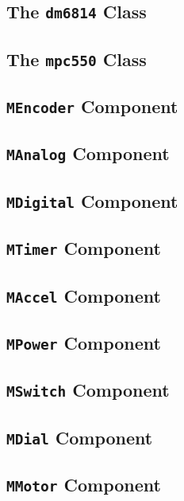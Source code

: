 \subsection{The {\tt dm6814} Class}

\subsection{The {\tt mpc550} Class}

\subsection{{\tt MEncoder} Component}

\subsection{{\tt MAnalog} Component}

\subsection{{\tt MDigital} Component}

\subsection{{\tt MTimer} Component}

\subsection{{\tt MAccel} Component}

\subsection{{\tt MPower} Component}

\subsection{{\tt MSwitch} Component}

\subsection{{\tt MDial} Component}

\subsection{{\tt MMotor} Component}

